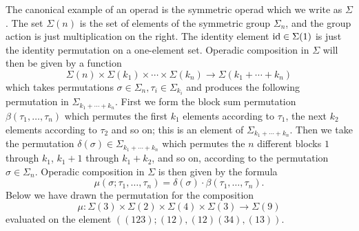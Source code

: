 \begin{example}\label{exSigma}
The canonical example of an operad is the symmetric operad which we write as $\Sigma$. The set $\Sigma(n)$ is the set of elements of the symmetric group $\Sigma_{n}$, and the group action is just multiplication on the right. The identity element $\textrm{id} \in \Sigma(1)$ is just the identity permutation on a one-element set. Operadic composition in $\Sigma$ will then be given by a function
  \[
    \Sigma(n) \times \Sigma(k_{1}) \times \cdots \times \Sigma(k_{n}) \rightarrow \Sigma(k_{1} + \cdots + k_{n})
  \]
which takes permutations $\sigma \in \Sigma_{n}, \tau_{i} \in \Sigma_{k_{i}}$ and produces the following permutation in $\Sigma_{k_{1} + \cdots + k_{n}}$. First we form the block sum permutation $\beta(\tau_1,\ldots,\tau_n)$ which permutes the first $k_{1}$ elements according to $\tau_{1}$, the next $k_{2}$ elements according to $\tau_{2}$ and so on; this is an element of $\Sigma_{k_{1} + \cdots + k_{n}}$. Then we take the permutation $\delta(\sigma) \in \Sigma_{k_{1} + \cdots + k_{n}}$ which permutes the $n$ different blocks $1$ through $k_{1}$, $k_{1}+1$ through $k_{1} + k_{2}$, and so on, according to the permutation $\sigma \in \Sigma_{n}$. Operadic composition in $\Sigma$ is then given by the formula
  \[
    \mu(\sigma; \tau_{1}, \ldots, \tau_{n}) = \delta(\sigma) \cdot \beta(\tau_1,\ldots,\tau_n).
  \]
Below we have drawn the permutation for the composition
  \[
    \mu \colon \Sigma(3) \times \Sigma(2) \times \Sigma(4) \times \Sigma(3) \rightarrow \Sigma(9)
  \]
evaluated on the element $\left( (123); (12), (12)(34), (13) \right)$.
  \begin{center}
  \end{center}

\end{example}
